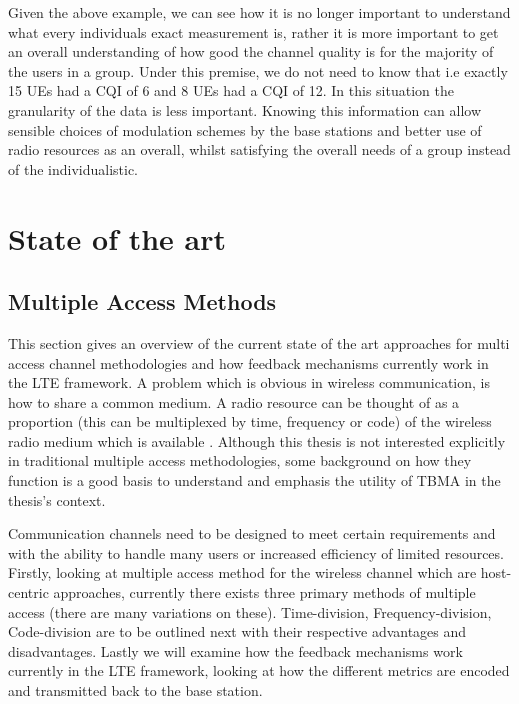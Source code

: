\documentclass{article}
\begin{document}
Given the above example, we can see how it is no longer important to understand what every individuals exact measurement is, rather it is more important to get an overall understanding of how good the channel quality is for the majority of the users in a group. Under this premise, we do not need to know that i.e exactly 15 UEs had a CQI of 6 and 8 UEs had a CQI of 12. In this situation the granularity of the data is less important. Knowing this information can allow sensible choices of modulation schemes by the base stations and better use of radio resources as an overall, whilst satisfying the overall needs of a group instead of the individualistic. 

\section{State of the art} \label{sota}
\subsection{Multiple Access Methods}
This section gives an overview of the current state of the art approaches for multi access channel methodologies and how feedback mechanisms currently work in the LTE framework. A problem which is obvious in wireless communication, is how to share a common medium. A radio resource can be thought of as a proportion (this can be multiplexed by time, frequency or code) of the wireless radio medium which is available \cite{access_tech}. Although this thesis is not interested explicitly in traditional multiple access methodologies, some background on how they function is a good basis to understand and emphasis the utility of TBMA in the thesis's context. 

Communication channels need to be designed to meet certain requirements and with the ability to handle many users or increased efficiency of limited resources. Firstly, looking at multiple access method for the wireless channel which are host-centric approaches, currently there exists three primary methods of multiple access (there are many variations on these). Time-division, Frequency-division, Code-division are to be outlined next with their respective advantages and disadvantages. Lastly we will examine how the feedback mechanisms work currently in the LTE framework, looking at how the different metrics are encoded and transmitted back to the base station.  \newline
\end{document}
